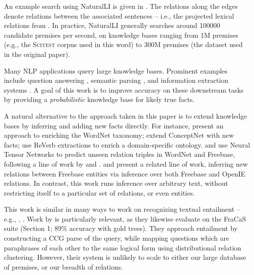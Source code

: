 An example search using NaturalLI is given in .
The relations along the edges denote relations between the associated sentences
  -- i.e., the projected lexical relations from .
In practice, NaturalLI generally searches around \num{100000} candidate premises
  per second, on knowledge bases ranging from 1M premises (e.g., the \textsc{Scitest}
  corpus used in this word) to 300M premises (the dataset used in the original paper).

%
%
Many NLP applications query large knowledge bases.
Prominent examples include
  question answering
    \cite{key:2001voorhees-trec},
  semantic parsing
    \cite{key:1996zelle-semantics,key:2007zettlemoyer-semantics,key:2013kwiatkowski-semantics,key:2014berant-semantics},
  and information extraction systems
    \cite{key:2011hoffman-kbp,key:2012surdeanu-mimlre}.
A goal of this work is to improve accuracy on these
  downstream tasks by providing a \textit{probabilistic} knowledge base
  for
  likely true facts.

A natural alternative to the approach taken in this paper is to
  extend knowledge bases by inferring and adding new facts directly.
For instance,
   present an approach to enriching 
    the WordNet taxonomy;
   extend ConceptNet with new facts;
   use ReVerb extractions to 
    enrich a domain-specific ontology.
 and 
  use Neural Tensor Networks to predict unseen relation triples in
  WordNet and Freebase, following a line of work by
   and
  .
 and 
  present a related line of work, inferring new relations between
  Freebase entities via inference over both Freebase and
  OpenIE relations.
In contrast, this work runs inference over arbitrary text, without 
  restricting itself to a particular set of relations, or even entities.

This work is similar in many ways to work on 
  recognizing textual entailment -- e.g., 
  , .
Work by  is particularly relevant,
  as they likewise evaluate on the FraCaS suite (Section 1;
  89\% accuracy with gold trees).
They approach entailment by constructing a CCG parse of the query,
  while mapping questions which are paraphrases of each other to the
  same logical form using distributional relation clustering.
However, their system is unlikely to scale to either our large
  database of premises, or our breadth of relations.

